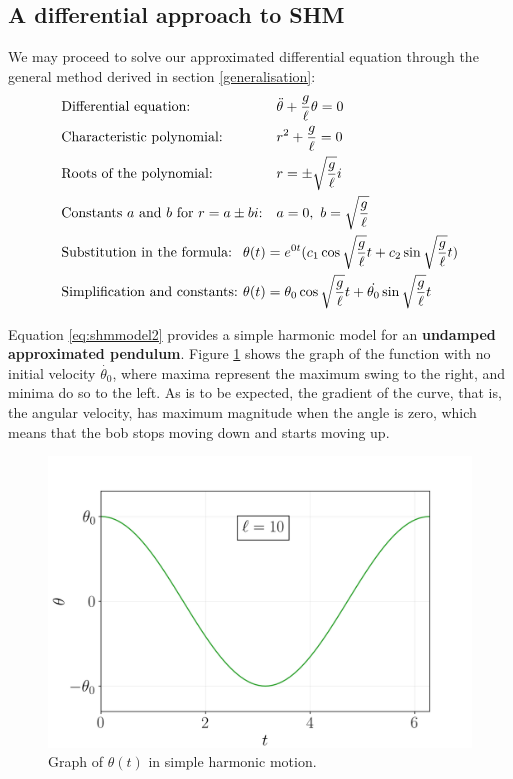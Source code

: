 \documentclass[12pt, a4paper, titlepage]{article}
\theoremstyle{definition}
\numberwithin{equation}{section}
\theoremstyle{definition}
\theoremstyle{definition}
\begin{document}
\subsection{A differential approach to SHM}
We may proceed to solve our approximated differential equation through the general method derived in section \ref{generalisation}:
\begin{align}
&\text{Differential equation:}&&\ddot{\theta}+\frac{g}{\ell}\theta=0\\
&\text{Characteristic polynomial:}&&r^2+\frac{g}{\ell}=0\\
&\text{Roots of the polynomial:}&&r=\pm\sqrt{\frac{g}{\ell}}i\\
&\text{Constants $a$ and $b$ for $r=a\pm bi$:}&&a=0,\ b=\sqrt{\frac{g}{\ell}}\\
&\text{Substitution in the formula:}&&\hspace{-24pt}\theta(t)=e^{0t}(c_1\cos{\sqrt{\frac{g}{\ell}}t}+c_2\sin{\sqrt{\frac{g}{\ell}}t})\\
&\text{Simplification and constants:}&&\hspace{-24pt}\theta(t)=\theta_0\cos{\sqrt{\frac{g}{\ell}}t}+\dot{\theta_0}\sin{\sqrt{\frac{g}{\ell}}t}\label{eq:shmmodel2}
\end{align}

Equation \eqref{eq:shmmodel2} provides a simple harmonic model for an \textbf{undamped approximated pendulum}. Figure \ref{fig:shm1} shows the graph of the function with no initial velocity $\dot{\theta_0}$, where maxima represent the maximum swing to the right, and minima do so to the left. As is to be expected, the gradient of the curve, that is, the angular velocity, has maximum magnitude when the angle is zero, which means that the bob stops moving down and starts moving up.
\begin{figure}[H]
    \centering
    \includegraphics[scale=0.6]{shm1.png}
    \caption{Graph of $\theta(t)$ in simple harmonic motion.}
    \label{fig:shm1}
\end{figure}
\end{document}
